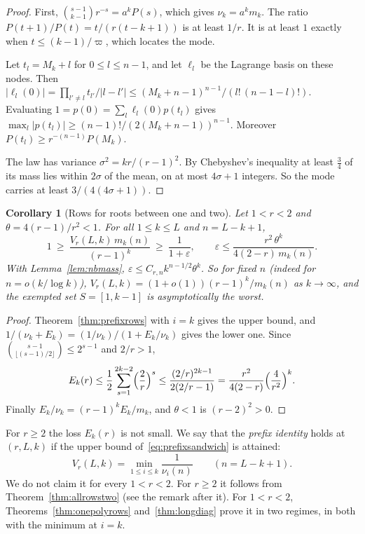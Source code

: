 \documentclass[11pt]{article}
\newtheorem{corollary}[theorem]{Corollary}
\begin{document}
\begin{proof}
First, $\binom{s-1}{k-1}r^{-s}=a^kP(s)$, which gives $\nu_k=a^km_k$.  The
ratio $P(t+1)/P(t)=t/(r(t-k+1))$ is at least $1/r$.  It is at least $1$
exactly when $t\le(k-1)/\varpi$, which locates the mode.

Let $t_l=M_k+l$ for $0\le l\le n-1$, and let $\ell_l$ be the Lagrange basis
on these nodes.  Then
$|\ell_l(0)|=\prod_{l'\ne l}t_{l'}/|l-l'|\le(M_k+n-1)^{n-1}/(l!\,(n-1-l)!)$.
Evaluating $1=p(0)=\sum_l\ell_l(0)p(t_l)$ gives
$\max_l|p(t_l)|\ge(n-1)!/(2(M_k+n-1))^{n-1}$.  Moreover
$P(t_l)\ge r^{-(n-1)}P(M_k)$.

The law has variance $\sigma^2=kr/(r-1)^2$.  By Chebyshev's inequality at
least $\frac34$ of its mass lies within $2\sigma$ of the mean, on at most
$4\sigma+1$ integers.  So the mode carries at least $3/(4(4\sigma+1))$.
\end{proof}

\begin{corollary}[Rows for roots between one and two]\label{cor:belowtwo}
Let $1<r<2$ and $\theta=4(r-1)/r^2<1$.  For all $1\le k\le L$ and $n=L-k+1$,
\[
  1\ \ge\ \frac{V_r(L,k)\,m_k(n)}{(r-1)^k}\ \ge\
  \frac1{1+\varepsilon},\qquad
  \varepsilon\le\frac{r^2\,\theta^k}{4(2-r)\,m_k(n)} .
\]
With Lemma~\ref{lem:nbmass}, $\varepsilon\le C_{r,n}k^{n-1/2}\theta^k$.  So
for fixed $n$ (indeed for $n=o(k/\log k)$),
$V_r(L,k)=(1+o(1))(r-1)^k/m_k(n)$ as $k\to\infty$, and the exempted set
$S=[1,k-1]$ is asymptotically the worst.
\end{corollary}

\begin{proof}
Theorem~\ref{thm:prefixrows} with $i=k$ gives the upper bound, and
$1/(\nu_k+E_k)=(1/\nu_k)/(1+E_k/\nu_k)$ gives the lower one.  Since
$\binom{s-1}{\lfloor(s-1)/2\rfloor}\le2^{s-1}$ and $2/r>1$,
\[
  E_k(r)\le\frac12\sum_{s=1}^{2k-2}\Bigl(\frac2r\Bigr)^s\le
  \frac{(2/r)^{2k-1}}{2(2/r-1)}=\frac{r^2}{4(2-r)}\Bigl(\frac4{r^2}\Bigr)^k .
\]
Finally $E_k/\nu_k=(r-1)^kE_k/m_k$, and $\theta<1$ is $(r-2)^2>0$.
\end{proof}

For $r\ge2$ the loss $E_k(r)$ is not small.  We say that the
\emph{prefix identity} holds at $(r,L,k)$ if the upper bound
of~\eqref{eq:prefixsandwich} is attained:
\begin{equation}\label{eq:prefixid}
  V_r(L,k)=\min_{1\le i\le k}\frac1{\nu_i(n)}\qquad(n=L-k+1).
\end{equation}
We do not claim it for every $1<r<2$.
For $r\ge2$ it follows from Theorem~\ref{thm:allrowstwo} (see the remark
after it).  For $1<r<2$, Theorems~\ref{thm:onepolyrows}
and~\ref{thm:longdiag} prove it in two regimes, in both with the minimum at
$i=k$.
\end{document}
